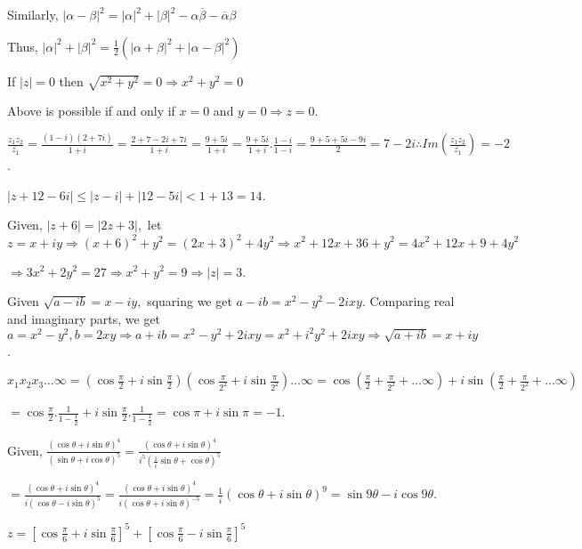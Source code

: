   Similarly, $|\alpha - \beta|^2 = |\alpha|^2 + |\beta|^2 - \alpha\overline{\beta} - \overline{\alpha}\beta$

  Thus, $|\alpha|^2 + |\beta|^2 = \frac{1}{2}(|\alpha + \beta|^2 + |\alpha - \beta|^2)$
\item If $|z| = 0$ then $\sqrt{x^2 + y^2} = 0 \Rightarrow x^2 + y^2 = 0$

  Above is possible if and only if $x = 0$ and $y = 0 \Rightarrow z = 0$.
\item $\frac{z_1z_2}{\overline{z_1}} = \frac{(1 - i)(2 + 7i)}{1 + i} = \frac{2 + 7 -2i + 7i}{1 + i} =
  \frac{9 + 5i}{1 + i} = \frac{9 + 5i}{1 + i}.\frac{1 - i}{1 - i} = \frac{9 + 5 + 5i -9i}{2} = 7 -
  2i\therefore Im\left(\frac{z_1z_2}{\overline{z_1}}\right) = -2$.
\item $|z + 12 - 6i| \leq |z - i| + |12 - 5i| < 1 + 13 = 14$.
\item Given, $|z + 6| = |2z + 3|,$ let $z = x + iy \Rightarrow (x + 6)^2 + y^2 = (2x + 3)^2 + 4y^2
  \Rightarrow x^2 + 12x + 36 + y^2 = 4x^2 + 12x + 9 + 4y^2$

  $\Rightarrow 3x^2 + 2y^2 = 27 \Rightarrow x^2 + y^2 = 9 \Rightarrow |z| = 3$.
\item Given $\sqrt{a - ib} = x - iy,$ squaring we get $a - ib = x^2 - y^2 - 2ixy$. Comparing real and
  imaginary parts, we get
  $a = x^2 - y^2, b = 2xy \Rightarrow a + ib = x^2 - y^2 + 2ixy = x^2 +i^2y^2 + 2ixy\Rightarrow \sqrt{a +
    ib} = x + iy$.
\item $x_1x_2x_3\ldots\infty = \left(\cos\frac{\pi}{2} + i\sin\frac{\pi}{2}\right)\left(\cos\frac{\pi}{2^2}
  + i\sin\frac{\pi}{2^2}\right) \ldots\infty= \cos\left(\frac{\pi}{2} + \frac{\pi}{2^2} + \ldots
  \infty\right) + i\sin\left(\frac{\pi}{2} + \frac{\pi}{2^2} + \ldots \infty\right)$

  $= \cos\frac{\pi}{2}.\frac{1}{1- \frac{1}{2}} + i\sin\frac{\pi}{2}.\frac{1}{1- \frac{1}{2}} = \cos\pi +
  i\sin\pi = -1$.
\item Given, $\frac{(\cos\theta + i\sin\theta)^4}{(\sin\theta + i\cos\theta)^5} = \frac{(\cos\theta +
  i\sin\theta)^4}{i^5\left(\frac{1}{i}\sin\theta + \cos\theta\right)^5}$

  $= \frac{(\cos\theta + i\sin\theta)^4}{i(\cos\theta - i\sin\theta)^5} = \frac{(\cos\theta +
  i\sin\theta)^4}{i(\cos\theta + i\sin\theta)^{-5}}= \frac{1}{i}(\cos\theta + i\sin\theta)^9 = \sin9\theta
  -i \cos9\theta$.
\item $z = \left[\cos\frac{\pi}{6} + i\sin\frac{\pi}{6}\right]^5 + \left[\cos\frac{\pi}{6} - i\sin\frac{\pi}{6}\right]^5$


